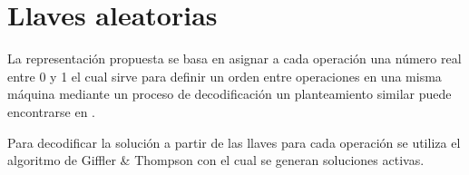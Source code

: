 \section{Llaves aleatorias}
La representación propuesta se basa en asignar a cada operación una número real entre 0 y 1 el cual sirve para definir un orden entre operaciones en una misma máquina mediante un proceso de decodificación un planteamiento similar puede encontrarse en \cite{norman1996random}.

Para decodificar la solución a partir de las llaves para cada operación se utiliza el algoritmo de Giffler \& Thompson \cite{Giffler1960} con el cual se generan soluciones activas.